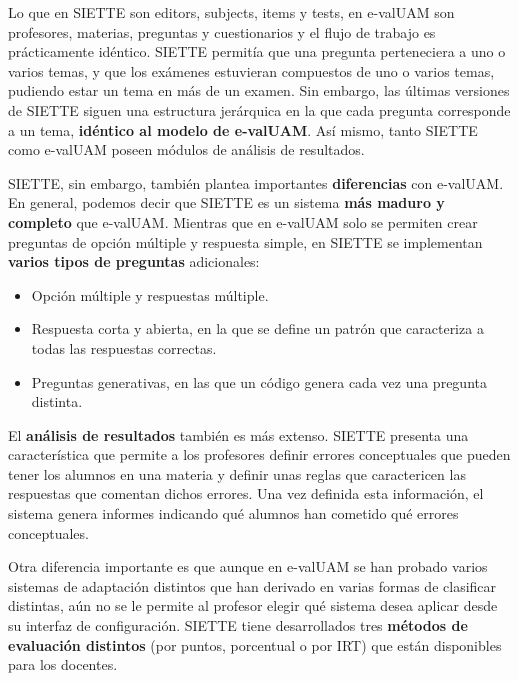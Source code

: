 Lo que en SIETTE son editors, subjects, items y tests, en e-valUAM son profesores, materias, preguntas y cuestionarios y el flujo de trabajo es prácticamente idéntico. SIETTE permitía que una pregunta perteneciera a uno o varios temas, y que los exámenes estuvieran compuestos de uno o varios temas, pudiendo estar un tema en más de un examen\cite{Conejo04}. Sin embargo, las últimas versiones de SIETTE siguen una estructura jerárquica en la que cada pregunta corresponde a un tema, \textbf{idéntico al modelo de e-valUAM}. Así mismo, tanto SIETTE como e-valUAM poseen módulos de análisis de resultados. 

SIETTE, sin embargo, también plantea importantes \textbf{diferencias} con e-valUAM. En general, podemos decir que SIETTE es un sistema \textbf{más maduro y completo} que e-valUAM. Mientras que en e-valUAM solo se permiten crear preguntas de opción múltiple y respuesta simple, en SIETTE se implementan \textbf{varios tipos de preguntas} adicionales:

\begin{itemize}
	\item Opción múltiple y respuestas múltiple.
	\item Respuesta corta y abierta, en la que se define un patrón que caracteriza a todas las respuestas correctas.
	\item Preguntas generativas, en las que un código genera cada vez una pregunta distinta.
\end{itemize}

El \textbf{análisis de resultados} también es más extenso. SIETTE presenta una característica que permite a los profesores definir errores conceptuales que pueden tener los alumnos en una materia y definir unas reglas que caractericen las respuestas que comentan dichos errores. Una vez definida esta información, el sistema genera informes indicando qué alumnos han cometido qué errores conceptuales.

Otra diferencia importante es que aunque en e-valUAM se han probado varios sistemas de adaptación distintos que han derivado en varias formas de clasificar distintas, aún no se le permite al profesor elegir qué sistema desea aplicar desde su interfaz de configuración. SIETTE tiene desarrollados tres \textbf{métodos de evaluación distintos} (por puntos, porcentual o por \acrshort{IRT}) que están disponibles para los docentes.

